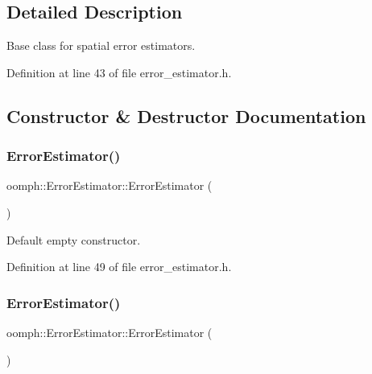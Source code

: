 \subsection{Detailed Description}
Base class for spatial error estimators. 

Definition at line 43 of file error\+\_\+estimator.\+h.



\subsection{Constructor \& Destructor Documentation}
\mbox{\label{classoomph_1_1ErrorEstimator_a43b3800b6695fe3fd13241b0530a0d0c}} 
\subsubsection{\texorpdfstring{Error\+Estimator()}{ErrorEstimator()}\hspace{0.1cm}{\footnotesize\ttfamily [1/2]}}
{\footnotesize\ttfamily oomph\+::\+Error\+Estimator\+::\+Error\+Estimator (\begin{DoxyParamCaption}{ }\end{DoxyParamCaption})\hspace{0.3cm}{\ttfamily [inline]}}



Default empty constructor. 



Definition at line 49 of file error\+\_\+estimator.\+h.

\mbox{\label{classoomph_1_1ErrorEstimator_a264c3159d8f4a07459d08d263d340bf8}} 
\subsubsection{\texorpdfstring{Error\+Estimator()}{ErrorEstimator()}\hspace{0.1cm}{\footnotesize\ttfamily [2/2]}}
{\footnotesize\ttfamily oomph\+::\+Error\+Estimator\+::\+Error\+Estimator (\begin{DoxyParamCaption}\item[{const \hyperlink{classoomph_1_1ErrorEstimator}{Error\+Estimator} \&}]{ }\end{DoxyParamCaption})\hspace{0.3cm}{\ttfamily [inline]}}



